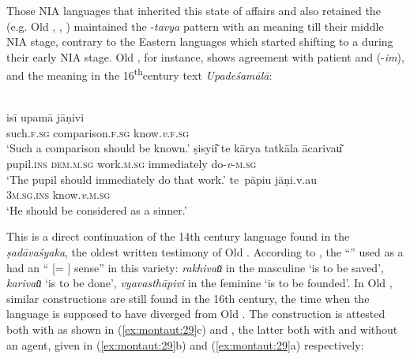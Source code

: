 \documentclass[output=paper]{langsci/langscibook}
\begin{document}
Those NIA languages that inherited this state of affairs and also retained the  (e.g. Old , , ) maintained the -\textit{tavya} pattern with an  meaning till their middle NIA stage, contrary to the Eastern languages which started shifting to a  during their early NIA stage. Old , for instance, shows agreement with patient and  (-\textit{im}), and the  meaning in the 16\textsuperscript{th}century text \textit{Upadeśamālā}:

\ea
\label{ex:montaut:28}
\ea 
{}\\
 \gll isī  upamā                jāṇivi   \\
 such.\textsc{f.sg}   comparison.\textsc{f.sg} know.\textit{v}.\textsc{f.sg} \\
\glt ‘Such a comparison should be known.’ \citep[64--65]{Dave1935}
\ex  
\gll ṣisyii͂   te      kārya         tatkāla ācarivau͂\\
 pupil.\textsc{ins} \textsc{dem.m.sg}     work.\textsc{m.sg}   immediately   do-\textit{v}{}-\textsc{m.sg}  \\
\glt ‘The pupil should immediately do that work.’ \citep[94]{Dave1935}
\ex
\gll te~pāpiu   jāṇi.v.au  \\
 \textsc{3m.sg.ins} know.\textit{v}.\textsc{m.sg}\\
\glt ‘He should be considered as a sinner.’ \citep[54]{Dave1935}
\z 
\z 

This is a direct continuation of the 14th\textsuperscript{} century language found in the \textit{ṣadāvaśyaka}, the oldest written testimony of Old . According to \citet[23]{Pandit1976}, the “” used as a  had an “ [= ] sense” in this variety: \textit{rakhivau͂} in the masculine ‘is to be saved’, \textit{karivau͂} ‘is to be done’, \textit{vyavasthāpivi} in the feminine ‘is to be founded’.
  In Old , similar  constructions are still found in the 16th century, the time when the language is supposed to have diverged from Old . The  construction is attested both with  as shown in (\ref{ex:montaut:29}c) and  , the latter both with and without an agent, given in (\ref{ex:montaut:29}b) and (\ref{ex:montaut:29}a) respectively:
\end{document}
